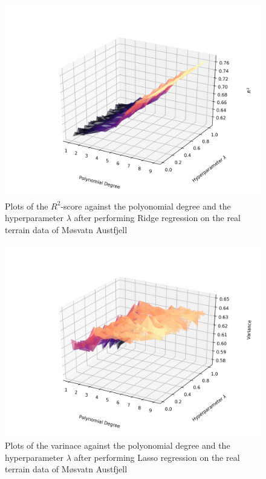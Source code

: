 \documentclass[a4paper,10pt,english]{article}
\begin{document}
\begin{figure}[H]
	\centering 
	\includegraphics[scale=0.6]{../real_output/part_D_3.png}
	\caption{
		Plots of the $R^2$-score against the polyonomial degree and the hyperparameter $\lambda$ after performing Ridge regression on the real terrain data of Møsvatn Austfjell
	}
	\label{part_g_d3}
\end{figure}



\begin{figure}[H]
	\centering 
	\includegraphics[scale=0.6]{../real_output/part_E_1.png}
	\caption{
		Plots of the varinace against the polyonomial degree and the hyperparameter $\lambda$ after performing Lasso regression on the real terrain data of Møsvatn Austfjell
	}
	\label{part_g_e1}
\end{figure}
\end{document}
